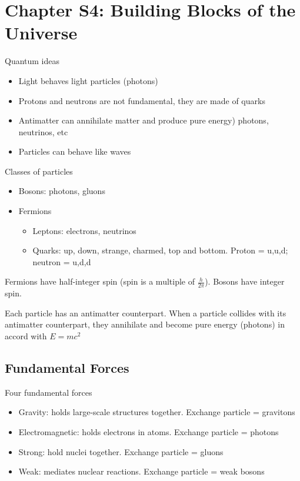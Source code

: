 \section{Chapter S4: Building Blocks of the Universe}

Quantum ideas
\begin{itemize}
    \item Light behaves light particles (photons)
    \item Protons and neutrons are not fundamental, they are made of quarks
    \item Antimatter can annihilate matter and produce pure energy) photons, neutrinos, etc
    \item Particles can behave like waves
\end{itemize}

Classes of particles
\begin{itemize}
    \item Bosons: photons, gluons
    \item Fermions
    \begin{itemize}
        \item Leptons: electrons, neutrinos
        \item Quarks: up, down, strange, charmed, top and bottom.  Proton = u,u,d; neutron = u,d,d
    \end{itemize}
\end{itemize}

Fermions have half-integer spin (spin is a multiple of $\frac{h}{2\pi}$).  Bosons have integer spin.

Each particle has an antimatter counterpart.  When a particle collides with its antimatter counterpart, they annihilate and become pure energy (photons) in accord with $E = mc^2$

\subsection{Fundamental Forces}

Four fundamental forces
\begin{itemize}
    \item Gravity: holds large-scale structures together. Exchange particle = gravitons
    \item Electromagnetic: holds electrons in atoms. Exchange particle = photons
    \item Strong: hold nuclei together.  Exchange particle = gluons 
    \item Weak: mediates nuclear reactions. Exchange particle = weak bosons
\end{itemize}

